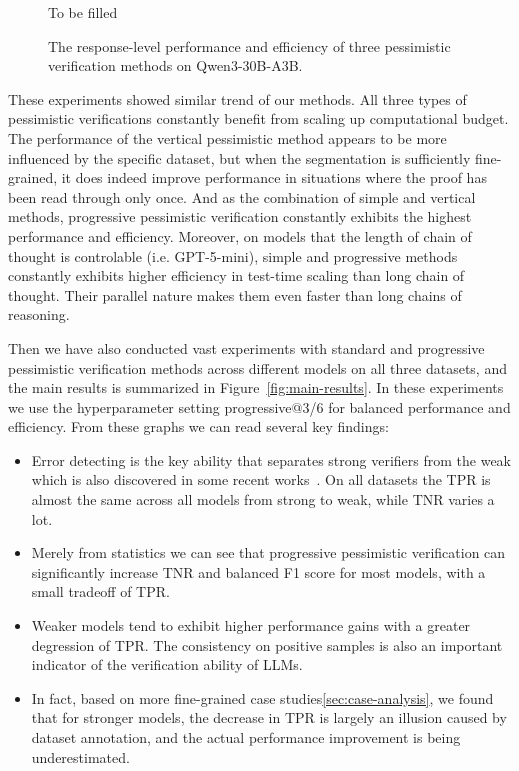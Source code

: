 \documentclass{article} %
\begin{document}
\begin{figure}[htbp]
  \centering
  To be filled
  \caption{The response-level performance and efficiency of three pessimistic verification methods on Qwen3-30B-A3B.}
  \label{fig:qwen-scaling}
\end{figure}

These experiments showed similar trend of our methods. All three types of pessimistic verifications constantly benefit from scaling up computational budget. The performance of the vertical pessimistic method appears to be more influenced by the specific dataset, but when the segmentation is sufficiently fine-grained, it does indeed improve performance in situations where the proof has been read through only once. And as the combination of simple and vertical methods, progressive pessimistic verification constantly exhibits the highest performance and efficiency. Moreover, on models that the length of chain of thought is controlable (i.e. GPT-5-mini), simple and progressive methods constantly exhibits higher efficiency in test-time scaling than long chain of thought. Their parallel nature makes them even faster than long chains of reasoning.

Then we have also conducted vast experiments with standard and progressive pessimistic verification methods across different models on all three datasets, and the main results is summarized in Figure~\ref{fig:main-results}. In these experiments we use the hyperparameter setting progressive@3/6 for balanced performance and efficiency. From these graphs we can read several key findings:

\begin{itemize}
  \item Error detecting is the key ability that separates strong verifiers from the weak which is also discovered in some recent works~\citep{pandit_hard2verify_2025}. On all datasets the TPR is almost the same across all models from strong to weak, while TNR varies a lot.
  \item Merely from statistics we can see that progressive pessimistic verification can significantly increase TNR and balanced F1 score for most models, with a small tradeoff of TPR.
  \item Weaker models tend to exhibit higher performance gains with a greater degression of TPR. The consistency on positive samples is also an important indicator of the verification ability of LLMs.
  \item In fact, based on more fine-grained case studies\ref{sec:case-analysis}, we found that for stronger models, the decrease in TPR is largely an illusion caused by dataset annotation, and the actual performance improvement is being underestimated.
\end{itemize}
\end{document}
